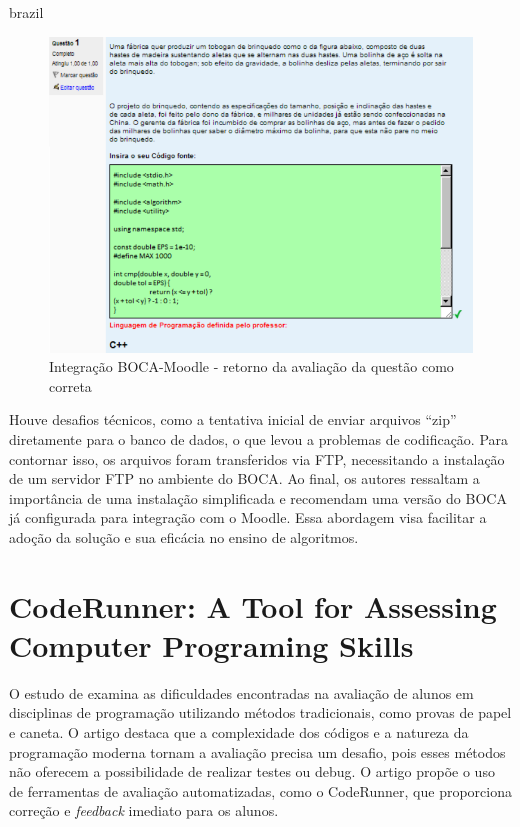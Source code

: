 \begin{otherlanguage*}{brazil}
\begin{figure}[h!]
	   \centering
            \caption{Integração BOCA-Moodle - retorno da avaliação da questão como correta}
            \label{fig:ModeloConceitual}
	   	\includegraphics[scale=0.5]{pictures/BOCA_correta.png}
\end{figure}

Houve desafios técnicos, como a tentativa inicial de enviar arquivos “zip” diretamente para o banco de dados, o que levou a problemas de codificação. Para contornar isso, os arquivos foram transferidos via FTP, necessitando a instalação de um servidor FTP no ambiente do BOCA. Ao final, os autores ressaltam a importância de uma instalação simplificada e recomendam uma versão do BOCA já configurada para integração com o Moodle. Essa abordagem visa facilitar a adoção da solução e sua eficácia no ensino de algoritmos.

\section{CodeRunner: A Tool for Assessing Computer Programing Skills}

O estudo de \textcite{lobbharlow} examina as dificuldades encontradas na avaliação de alunos em disciplinas de programação utilizando métodos tradicionais, como provas de papel e caneta. O artigo destaca que a complexidade dos códigos e a natureza da programação moderna tornam a avaliação precisa um desafio, pois esses métodos não oferecem a possibilidade de realizar testes ou debug. O artigo propõe o uso de ferramentas de avaliação automatizadas, como o CodeRunner, que proporciona correção e \textit{feedback} imediato para os alunos.	


\end{otherlanguage*}

